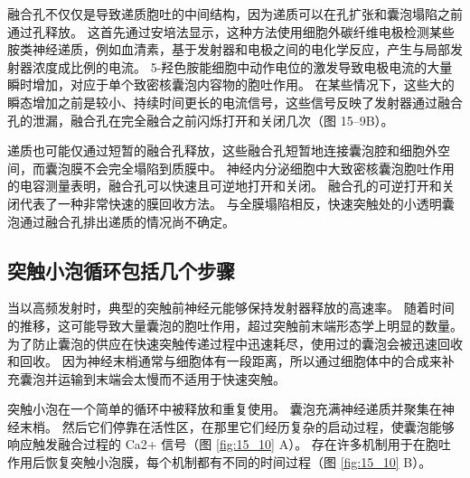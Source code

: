 融合孔不仅仅是导致递质胞吐的中间结构，因为递质可以在孔扩张和囊泡塌陷之前通过孔释放。 
这首先通过安培法显示，这种方法使用细胞外碳纤维电极检测某些胺类神经递质，例如血清素，基于发射器和电极之间的电化学反应，产生与局部发射器浓度成比例的电流。 
5-羟色胺能细胞中动作电位的激发导致电极电流的大量瞬时增加，对应于单个致密核囊泡内容物的胞吐作用。 
在某些情况下，这些大的瞬态增加之前是较小、持续时间更长的电流信号，这些信号反映了发射器通过融合孔的泄漏，融合孔在完全融合之前闪烁打开和关闭几次（图 15–9B）。


递质也可能仅通过短暂的融合孔释放，这些融合孔短暂地连接囊泡腔和细胞外空间，而囊泡膜不会完全塌陷到质膜中。 
神经内分泌细胞中大致密核囊泡胞吐作用的电容测量表明，融合孔可以快速且可逆地打开和关闭。 
融合孔的可逆打开和关闭代表了一种非常快速的膜回收方法。 
与全膜塌陷相反，快速突触处的小透明囊泡通过融合孔排出递质的情况尚不确定。



\subsection{突触小泡循环包括几个步骤}

当以高频发射时，典型的突触前神经元能够保持发射器释放的高速率。 
随着时间的推移，这可能导致大量囊泡的胞吐作用，超过突触前末端形态学上明显的数量。 
为了防止囊泡的供应在快速突触传递过程中迅速耗尽，使用过的囊泡会被迅速回收和回收。 
因为神经末梢通常与细胞体有一段距离，所以通过细胞体中的合成来补充囊泡并运输到末端会太慢而不适用于快速突触。


突触小泡在一个简单的循环中被释放和重复使用。 
囊泡充满神经递质并聚集在神经末梢。 
然后它们停靠在活性区，在那里它们经历复杂的启动过程，使囊泡能够响应触发融合过程的 Ca2+ 信号（图 \ref{fig:15_10} A）。 
存在许多机制用于在胞吐作用后恢复突触小泡膜，每个机制都有不同的时间过程（图 \ref{fig:15_10} B）。

